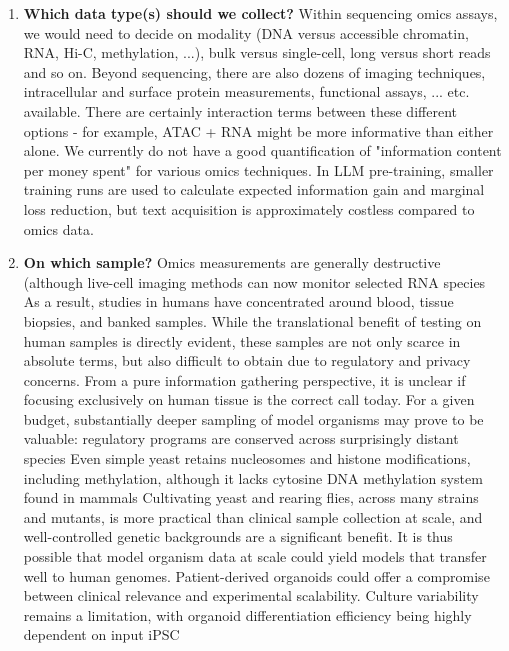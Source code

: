 \begin{enumerate}[noitemsep]

\item \textbf{Which data type(s) should we collect?} Within sequencing omics assays, we would need to decide on modality (DNA versus accessible chromatin, RNA, Hi-C, methylation, ...), bulk versus single-cell, long versus short reads and so on. Beyond sequencing, there are also dozens of imaging techniques, intracellular and surface protein measurements, functional assays, ... etc. available. There are certainly interaction terms between these different options - for example, ATAC + RNA might be more informative than either alone. We currently do not have a good quantification of "information content per money spent" for various omics techniques. In LLM pre-training, smaller training runs are used to calculate expected information gain and marginal loss reduction, but text acquisition is approximately costless compared to omics data.

\item \textbf{On which sample?} Omics measurements are generally destructive (although live-cell imaging methods can now monitor selected RNA species As a result, studies in humans have concentrated around blood, tissue biopsies, and banked samples. While the translational benefit of testing on human samples is directly evident, these samples are not only scarce in absolute terms, but also difficult to obtain due to regulatory and privacy concerns. From a pure information gathering perspective, it is unclear if focusing exclusively on human tissue is the correct call today. For a given budget, substantially deeper sampling of model organisms may prove to be valuable: regulatory programs are conserved across surprisingly distant species Even simple yeast retains nucleosomes and histone modifications, including methylation, although it lacks cytosine DNA methylation system found in mammals Cultivating yeast and rearing flies, across many strains and mutants, is more practical than clinical sample collection at scale, and well-controlled genetic backgrounds are a significant benefit. It is thus possible that model organism data at scale could yield models that transfer well to human genomes. Patient-derived organoids could offer a compromise between clinical relevance and experimental scalability. Culture variability remains a limitation, with organoid differentiation efficiency being highly dependent on input iPSC


\end{enumerate}
